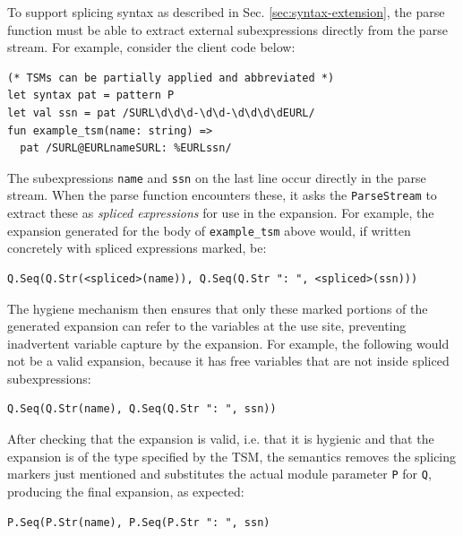 To support splicing syntax as described in Sec. \ref{sec:syntax-extension}, the parse function must be able to extract external subexpressions directly from the parse stream. For example, consider the client code below:
\begin{lstlisting}[numbers=none]
(* TSMs can be partially applied and abbreviated *)
let syntax pat = pattern P
let val ssn = pat /SURL\d\d\d-\d\d-\d\d\d\dEURL/
fun example_tsm(name: string) => 
  pat /SURL@EURLnameSURL: %EURLssn/
\end{lstlisting}
The subexpressions \lstinline{name} and \lstinline{ssn} on the last line occur directly in the parse stream. When the parse function encounters these, it asks the \lstinline{ParseStream} to extract these as \emph{spliced expressions} for use in the expansion. For example, the expansion generated for the body of \lstinline{example_tsm} above would, if written concretely with spliced expressions marked, be:
\begin{lstlisting}[numbers=none]
Q.Seq(Q.Str(<spliced>(name)), Q.Seq(Q.Str ": ", <spliced>(ssn)))
\end{lstlisting}
The hygiene mechanism then ensures that only these marked portions of the generated expansion can refer to the variables at the use site, preventing inadvertent variable capture by the expansion. For example, the following would not be a valid expansion, because it has free variables that are not inside spliced subexpressions:
\begin{lstlisting}[numbers=none]
Q.Seq(Q.Str(name), Q.Seq(Q.Str ": ", ssn))
\end{lstlisting}

After checking that the expansion is valid, i.e. that it is hygienic and that the expansion is of the type specified by the TSM, the semantics removes the splicing markers just mentioned and substitutes  the actual module parameter \lstinline{P} for \lstinline{Q}, producing the final expansion, as expected:
\begin{lstlisting}[numbers=none]
P.Seq(P.Str(name), P.Seq(P.Str ": ", ssn)
\end{lstlisting}

